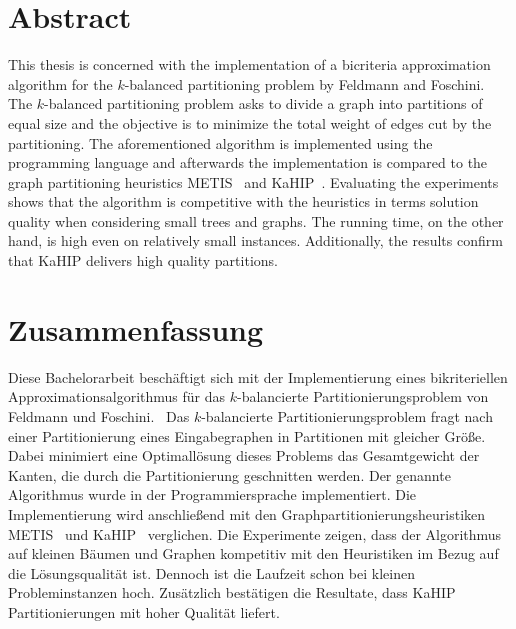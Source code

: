 \chapter{Abstract}
This thesis is concerned with the implementation of a bicriteria approximation algorithm for the $k$\hyp balanced partitioning problem by Feldmann and Foschini.~\cite{FF15}
The $k$\hyp balanced partitioning problem asks to divide a graph into partitions of equal size and the objective is to minimize the total weight of edges cut by the partitioning.
The aforementioned algorithm is implemented using the programming language \Cpp{} and afterwards the implementation is compared to the graph partitioning heuristics METIS~\cite{KK98} and KaHIP~\cite{SS13}.
Evaluating the experiments shows that the algorithm is competitive with the heuristics in terms solution quality when considering small trees and graphs.
The running time, on the other hand, is high even on relatively small instances.
Additionally, the results confirm that KaHIP delivers high quality partitions.

{\let\cleardoublepage\relax \chapter{Zusammenfassung}}
Diese Bachelorarbeit beschäftigt sich mit der Implementierung eines bikriteriellen Approximationsalgorithmus für das $k$\hyp balancierte Partitionierungsproblem von Feldmann und Foschini.~\cite{FF15}
Das $k$\hyp balancierte Partitionierungsproblem fragt nach einer Partitionierung eines Eingabegraphen in Partitionen mit gleicher Größe.
Dabei minimiert eine Optimallösung dieses Problems das Gesamtgewicht der Kanten, die durch die Partitionierung geschnitten werden.
Der genannte Algorithmus wurde in der Programmiersprache \Cpp{} implementiert.
Die Implementierung wird anschließend mit den Graphpartitionierungsheuristiken METIS~\cite{KK98} und KaHIP~\cite{SS13} verglichen.
Die Experimente zeigen, dass der Algorithmus auf kleinen Bäumen und Graphen kompetitiv mit den Heuristiken im Bezug auf die Lösungsqualität ist.
Dennoch ist die Laufzeit schon bei kleinen Probleminstanzen hoch.
Zusätzlich bestätigen die Resultate, dass KaHIP Partitionierungen mit hoher Qualität liefert.
